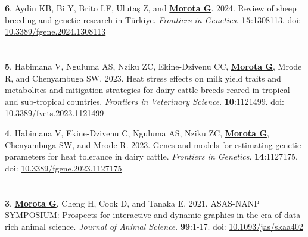 \documentclass[margin,line,10pt]{res}
\newenvironment{list1}{
  \begin{list}{\ding{113}}{%
      \setlength{\itemsep}{0in}
      \setlength{\parsep}{0in} \setlength{\parskip}{0in}
      \setlength{\topsep}{0in} \setlength{\partopsep}{0in} 
      \setlength{\leftmargin}{0.17in}}}{\end{list}}
\begin{document}
\begin{resume}
\begin{list1}
  \item  [{\bf 6}.] Aydin KB, Bi Y, Brito LF, Uluta\c{s} Z, and \textbf{\underline{Morota G}}. 2024. Review of sheep breeding and genetic research in T\"{u}rkiye. \emph{Frontiers in Genetics}. \textbf{15}:1308113. doi: \textcolor{blue}{\href{https://doi.org/10.3389/fgene.2024.1308113}{10.3389/fgene.2024.1308113}}

\end{list1}



\section{}
\begin{list1}

  \item  [{\bf 5}.] Habimana V, Nguluma AS, Nziku ZC, Ekine-Dzivenu CC, \textbf{\underline{Morota G}}, Mrode R, and Chenyambuga SW. 2023. Heat stress effects on milk yield traits and metabolites and mitigation strategies for dairy cattle breeds reared in tropical and sub-tropical countries. \emph{Frontiers in Veterinary Science}. \textbf{10}:1121499. doi: \textcolor{blue}{\href{https://doi.org/10.3389/fvets.2023.1121499}{10.3389/fvets.2023.1121499}} 


  \vspace{0.5cm}

  \item  [{\bf 4}.] Habimana V, Ekine-Dzivenu C, Nguluma AS, Nziku ZC, \textbf{\underline{Morota G}}, Chenyambuga SW, and Mrode R. 2023. Genes and models for estimating genetic parameters for heat tolerance in dairy cattle. \emph{Frontiers in Genetics}. \textbf{14}:1127175. doi: \textcolor{blue}{\href{https://doi.org/10.3389/fgene.2023.1127175}{10.3389/fgene.2023.1127175}} 

\end{list1}


\section{}
\begin{list1}

 \item  [{\bf 3}.] \textbf{\underline{Morota G}}, Cheng H, Cook D, and Tanaka E. 2021. ASAS-NANP SYMPOSIUM: Prospects for interactive and dynamic graphics in the era of data-rich animal science. \emph{Journal of Animal Science}.  \textbf{99}:1-17. doi: \textcolor{blue}{\href{https://doi.org/10.1093/jas/skaa402}{10.1093/jas/skaa402}} 
   

\end{list1}
\end{resume}
\end{document}
